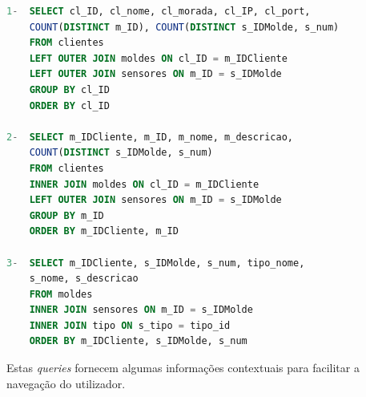 \documentclass[11pt,twoside,a4paper]{report}
\begin{document}
\begin{lstlisting}[language = SQL]
1-	SELECT cl_ID, cl_nome, cl_morada, cl_IP, cl_port,
	COUNT(DISTINCT m_ID), COUNT(DISTINCT s_IDMolde, s_num)
	FROM clientes
	LEFT OUTER JOIN moldes ON cl_ID = m_IDCliente
	LEFT OUTER JOIN sensores ON m_ID = s_IDMolde
	GROUP BY cl_ID
	ORDER BY cl_ID
	
2-	SELECT m_IDCliente, m_ID, m_nome, m_descricao,
	COUNT(DISTINCT s_IDMolde, s_num)
	FROM clientes
	INNER JOIN moldes ON cl_ID = m_IDCliente
	LEFT OUTER JOIN sensores ON m_ID = s_IDMolde
	GROUP BY m_ID
	ORDER BY m_IDCliente, m_ID
	
3-	SELECT m_IDCliente, s_IDMolde, s_num, tipo_nome,
	s_nome, s_descricao
	FROM moldes
	INNER JOIN sensores ON m_ID = s_IDMolde
	INNER JOIN tipo ON s_tipo = tipo_id
	ORDER BY m_IDCliente, s_IDMolde, s_num
\end{lstlisting}
Estas \textit{queries} fornecem algumas informações contextuais para facilitar a navegação do utilizador.
\end{document}
